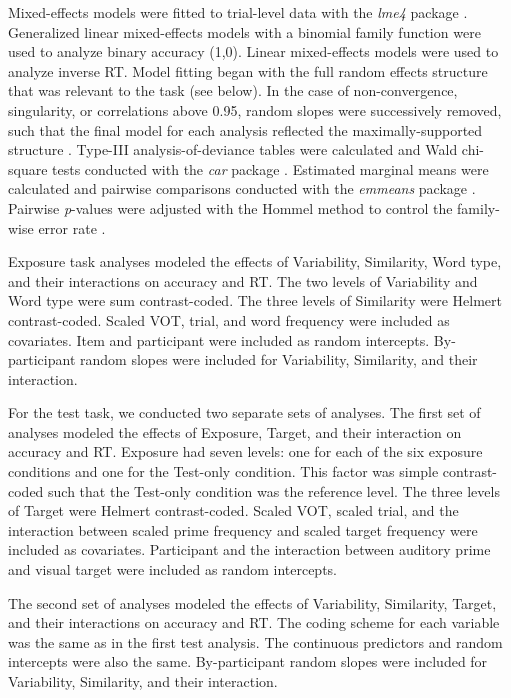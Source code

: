 \documentclass[preprint, 3p, authoryear]{elsarticle} %
\begin{document}
Mixed-effects models were fitted to trial-level data with the \emph{lme4} package \citep{bates2015}.
Generalized linear mixed-effects models with a binomial family function were used to analyze binary accuracy (1,0).
Linear mixed-effects models were used to analyze inverse RT.
Model fitting began with the full random effects structure that was relevant to the task (see below).
In the case of non-convergence, singularity, or correlations above 0.95, random slopes were successively removed, such that the final model for each analysis reflected the maximally-supported structure \citep{barr2013}.
Type-III analysis-of-deviance tables were calculated and Wald chi-square tests conducted with the \emph{car} package \citep{fox2019}.
Estimated marginal means were calculated and pairwise comparisons conducted with the \emph{emmeans} package \citep{lenth2022}.
Pairwise \emph{p}-values were adjusted with the Hommel method to control the family-wise error rate \citep{blakesley2009}.

Exposure task analyses modeled the effects of Variability, Similarity, Word type, and their interactions on accuracy and RT.
The two levels of Variability and Word type were sum contrast-coded.
The three levels of Similarity were Helmert contrast-coded.
Scaled VOT, trial, and word frequency were included as covariates.
Item and participant were included as random intercepts.
By-participant random slopes were included for Variability, Similarity, and their interaction.

For the test task, we conducted two separate sets of analyses.
The first set of analyses modeled the effects of Exposure, Target, and their interaction on accuracy and RT.
Exposure had seven levels: one for each of the six exposure conditions and one for the Test-only condition.
This factor was simple contrast-coded such that the Test-only condition was the reference level.
The three levels of Target were Helmert contrast-coded.
Scaled VOT, scaled trial, and the interaction between scaled prime frequency and scaled target frequency were included as covariates.
Participant and the interaction between auditory prime and visual target were included as random intercepts.

The second set of analyses modeled the effects of Variability, Similarity, Target, and their interactions on accuracy and RT.
The coding scheme for each variable was the same as in the first test analysis.
The continuous predictors and random intercepts were also the same.
By-participant random slopes were included for Variability, Similarity, and their interaction.
\end{document}
